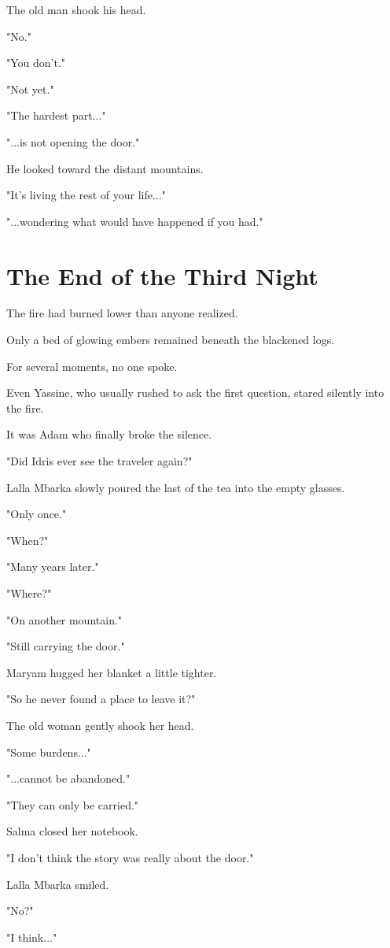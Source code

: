 \documentclass[12pt,openany]{book}
\begin{document}
The old man shook his head.

"No."

"You don't."

"Not yet."

"The hardest part..."

"...is not opening the door."

He looked toward the distant mountains.

"It's living the rest of your life..."

"...wondering what would have happened if you had."
\section*{The End of the Third Night}

The fire had burned lower than anyone realized.

Only a bed of glowing embers remained beneath the blackened logs.

For several moments, no one spoke.

Even Yassine, who usually rushed to ask the first question, stared silently into the fire.

It was Adam who finally broke the silence.

"Did Idris ever see the traveler again?"

Lalla Mbarka slowly poured the last of the tea into the empty glasses.

"Only once."

"When?"

"Many years later."

"Where?"

"On another mountain."

"Still carrying the door."

Maryam hugged her blanket a little tighter.

"So he never found a place to leave it?"

The old woman gently shook her head.

"Some burdens..."

"...cannot be abandoned."

"They can only be carried."

Salma closed her notebook.

"I don't think the story was really about the door."

Lalla Mbarka smiled.

"No?"

"I think..."
\end{document}
